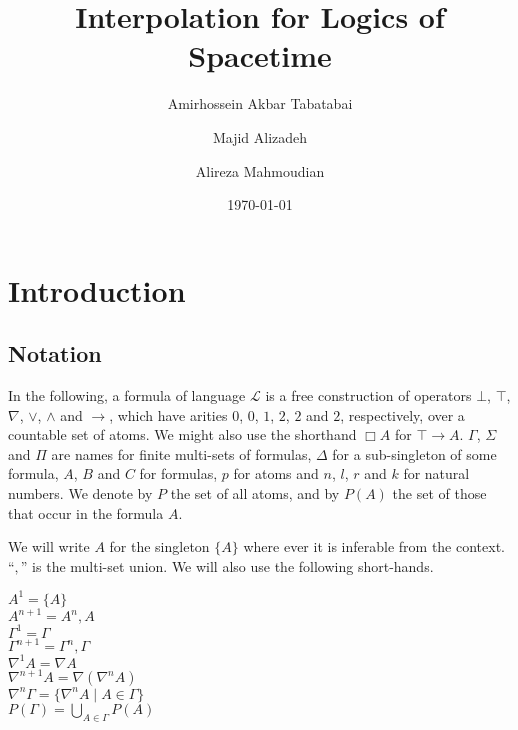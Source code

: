 \documentclass[10pt,a4paper]{amsart}
\begin{document}
\title{Interpolation for Logics of Spacetime}
\author{Amirhossein Akbar Tabatabai}


\author{Majid Alizadeh}

\author{Alireza Mahmoudian}

\date{\today}
 
\begin{abstract}
	
\end{abstract}

\maketitle



\section{Introduction}


\subsection{Notation}
In the following, a formula of language $\mathcal{L}$ is a free construction of operators $\bot$, $\top$, $\nabla$, $\vee$, $\wedge$ and $\rightarrow$, which have arities $0$, $0$, $1$, $2$, $2$ and $2$, respectively, over a countable set of atoms. We might also use the shorthand $\Box A$ for $\top \rightarrow A$.
$\Gamma$, $\Sigma$ and $\Pi$ are names for finite multi-sets of formulas, $\Delta$ for a sub-singleton of some formula, $A$, $B$ and $C$ for formulas, $p$ for atoms and $n$, $l$, $r$ and $k$ for natural numbers. We denote by $P$ the set of all atoms, and by $P(A)$ the set of those that occur in the formula $A$.

We will write $A$ for the singleton $\{A\}$ where ever it is inferable from the context.
``$,$'' is the multi-set union. We will also use the following short-hands.
\begin{flushleft}
  $ A^1 = \{ A \} $ \\
  $ A^{n+1} = A^n, A $ \\
  $ \Gamma^1 = \Gamma $ \\
  $ \Gamma^{n+1} = \Gamma^n, \Gamma $ \\
  $ \nabla^1 A = \nabla A $ \\
  $ \nabla^{n+1} A = \nabla (\nabla^n A) $ \\
  $ \nabla^n \Gamma = \{ \nabla^n A \mid A \in \Gamma \} $ \\
  $ P(\Gamma) = \bigcup_{A \in \Gamma} P(A) $
\end{flushleft}
\end{document}
